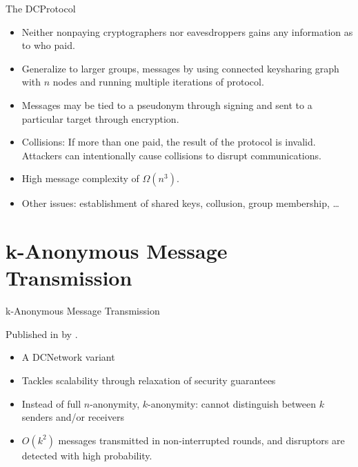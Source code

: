 \documentclass[]{beamer} %
\begin{document}
\begin{frame}{The \acl{DCProtocol}}

\begin{itemize}
\item Neither nonpaying cryptographers nor eavesdroppers gains any information as to who paid.
\item Generalize to larger groups, messages by using connected keysharing graph with $n$ nodes
      and running multiple iterations of protocol.
\item Messages may be tied to a pseudonym through signing and sent to a particular target
      through encryption.
\item Collisions: If more than one paid, the result of the protocol is invalid.
      Attackers can intentionally cause collisions to disrupt communications.
\item High message complexity of $\Omega(n^3)$.
\item Other issues: establishment of shared keys, collusion, group membership, \ldots
\end{itemize}

\end{frame}

\section{k-Anonymous Message Transmission}

\begin{frame}{k-Anonymous Message Transmission}

Published in \citeyear{von2003k} by \citeauthor{von2003k} \cite{von2003k}.

\begin{itemize}
\item A \ac{DCNetwork} variant
\item Tackles scalability through relaxation of security guarantees
\item Instead of full $n$-anonymity, $k$-anonymity: cannot distinguish between $k$
      senders and/or receivers
\item $O(k^2)$ messages transmitted in non-interrupted rounds, and disruptors
      are detected with high probability.
\end{itemize}

\end{frame}
\end{document}
